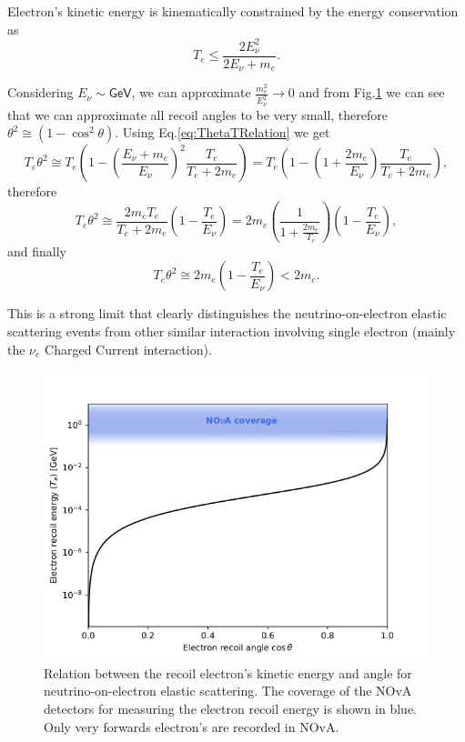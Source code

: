 Electron's kinetic energy is kinematically constrained by the energy conservation as
\begin{equation}
T_e\leq\frac{2E_{\nu}^2}{2E_{\nu}+m_e}.
\end{equation}

Considering $E_{\nu}\sim\textsf{GeV}$, we can approximate $\frac{m_e^2}{E_{\nu}^2}\rightarrow 0$ and from Fig.\ref{fig:TThetaDistribution} we can see that we can approximate all recoil angles to be very small, therefore $\theta^2\cong \left(1-\cos^2\theta\right)$. Using Eq.\ref{eq:ThetaTRelation} we get
\begin{equation}
T_e\theta^2\cong T_e\left(1-\left(\frac{E_\nu+m_e}{E_\nu}\right)^2\frac{T_e}{T_e+2m_e}\right)
=T_e\left(1-\left(1+\frac{2m_e}{E_\nu}\right)\frac{T_e}{T_e+2m_e}\right),
\end{equation}
therefore
\begin{equation}
T_e\theta^2\cong \frac{2m_eT_e}{T_e+2m_e}\left(1-\frac{T_e}{E_\nu}\right)=2m_e\left(\frac{1}{1+\frac{2m_e}{T_e}}\right)\left(1-\frac{T_e}{E_\nu}\right),
\end{equation}
and finally
\begin{equation}\label{eqTThetaSqExp}
T_e\theta^2\cong 2m_e\left(1-\frac{T_e}{E_{\nu}}\right)<2m_e.
\end{equation}

This is a strong limit that clearly distinguishes the neutrino-on-electron elastic scattering events from other similar interaction involving single electron (mainly the $\nu_e$ Charged Current interaction).

\begin{figure}[hbtp]
\centering
\includegraphics[width=.7\linewidth]{Plots/NuMM/KinematicsTOnTh.jpeg}
\caption{Relation between the recoil electron's kinetic energy and angle for neutrino-on-electron elastic scattering. The coverage of the NOvA detectors for measuring the electron recoil energy is shown in blue. Only very forwards electron's are recorded in NOvA.}
\label{fig:TThetaDistribution}
\end{figure}


